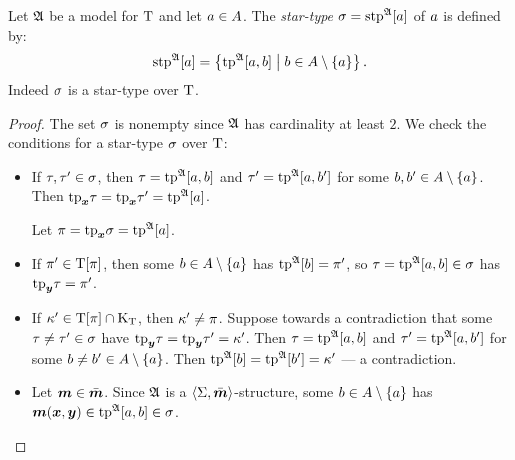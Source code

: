 \begin{definition}
Let $\mathfrak{A}$ be a model for $\mathrm{T}$
and let $a\in A$.
The \emph{star-type} $\sigma = \operatorname{stp}^{\mathfrak{A}}[a]$ of $a$ is defined by:
\[
  \operatorname{stp}^{\mathfrak{A}}[a] = \left\{\operatorname{tp}^{\mathfrak{A}}[a,b]\mathrel{}\middle|\mathrel{}b \in A \setminus \left\{a\right\}\right\}.
\]
Indeed $\sigma$ is a star-type over $\mathrm{T}$.
\end{definition}
\begin{proof}
The set $\sigma$ is nonempty since $\mathfrak{A}$ has cardinality at least $2$.
We check the conditions for a star-type $\sigma$ over $\mathrm{T}$:
\begin{itemize}
  \item[\refcondstpx]
  If $\tau,{\tau'}\in\sigma$,
  then $\tau=\operatorname{tp}^{\mathfrak{A}}[a,b]$ and ${\tau'}=\operatorname{tp}^{\mathfrak{A}}[a,{b'}]$ for some
  $b,{b'}\in A\setminus\left\{a\right\}$.
  Then $\mathrm{tp}_{\bm{x}}\tau = \mathrm{tp}_{\bm{x}}{\tau'} = \operatorname{tp}^{\mathfrak{A}}[a]$.
  
  Let $\pi = \mathrm{tp}_{\bm{x}}\sigma = \operatorname{tp}^{\mathfrak{A}}[a]$.
  \item[\refcondstppy]
  If ${\pi'}\in\mathrm{T}[\pi]$,
  then some $b\in A\setminus\left\{a\right\}$ has $\operatorname{tp}^{\mathfrak{A}}[b] = {\pi'}$, so
  $\tau = \operatorname{tp}^{\mathfrak{A}}[a,b] \in \sigma$ has $\mathrm{tp}_{\bm{y}}\tau = {\pi'}$.
  \item[\refcondstpky]
  If ${\kappa'}\in\mathrm{T}[\pi]\cap{\mathrm{K}}_{\mathrm{T}}$, then ${\kappa'}\neq\pi$.
  Suppose towards a contradiction that some $\tau\neq{\tau'}\in\sigma$ have
  $\mathrm{tp}_{\bm{y}}\tau=\mathrm{tp}_{\bm{y}}{\tau'}={\kappa'}$.
  Then $\tau=\operatorname{tp}^{\mathfrak{A}}[a,b]$ and ${\tau'}=\operatorname{tp}^{\mathfrak{A}}[a,{b'}]$ for some
  $b\neq{b'}\in A\setminus\left\{a\right\}$.
  Then $\operatorname{tp}^{\mathfrak{A}}[b]=\operatorname{tp}^{\mathfrak{A}}[{b'}]={\kappa'}$ --- a contradiction.
  \item[\refcondstpm]
  Let $\bm{m}\in\bar{\bm{m}}$.
  Since $\mathfrak{A}$ is a $\left\langle \mathrm{\Sigma},\bar{\bm{m}} \right\rangle$-structure, some $b\in A\setminus\left\{a\right\}$
  has $\bm{m}(\bm{x},\bm{y}) \in \operatorname{tp}^{\mathfrak{A}}[a,b] \in \sigma$.
\end{itemize}
\end{proof}

